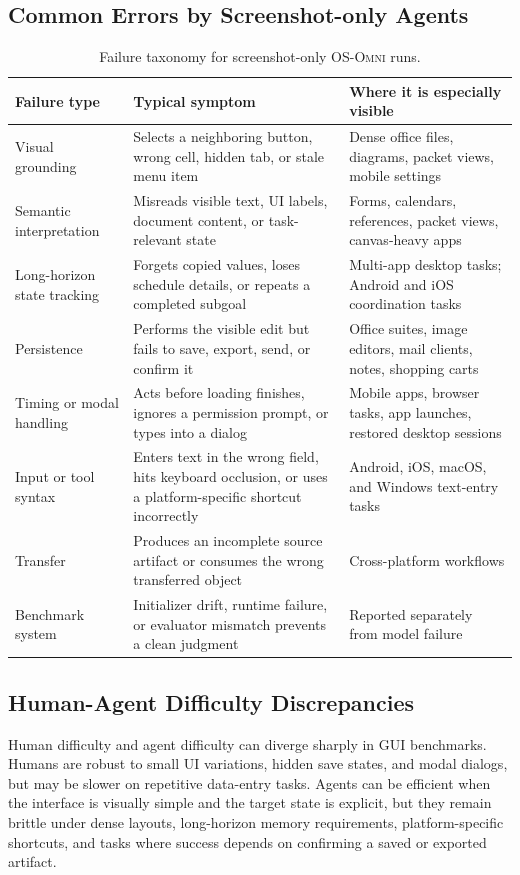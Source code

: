 \subsection{Common Errors by Screenshot-only Agents}
\label{appendix:common_errors}
\begin{table}[ht]
\centering
\caption{Failure taxonomy for screenshot-only \textsc{OS-Omni} runs.}
\label{tab:screenshot_only_failure_taxonomy}
\footnotesize
\setlength{\tabcolsep}{4pt}
\renewcommand{\arraystretch}{1.02}
\begin{tabular}{p{2.8cm}p{5.4cm}p{5.8cm}}
\toprule
Failure type & Typical symptom & Where it is especially visible \\
\midrule
Visual grounding & Selects a neighboring button, wrong cell, hidden tab, or stale menu item & Dense office files, diagrams, packet views, mobile settings \\
Semantic interpretation & Misreads visible text, UI labels, document content, or task-relevant state & Forms, calendars, references, packet views, canvas-heavy apps \\
Long-horizon state tracking & Forgets copied values, loses schedule details, or repeats a completed subgoal & Multi-app desktop tasks; Android and iOS coordination tasks \\
Persistence & Performs the visible edit but fails to save, export, send, or confirm it & Office suites, image editors, mail clients, notes, shopping carts \\
Timing or modal handling & Acts before loading finishes, ignores a permission prompt, or types into a dialog & Mobile apps, browser tasks, app launches, restored desktop sessions \\
Input or tool syntax & Enters text in the wrong field, hits keyboard occlusion, or uses a platform-specific shortcut incorrectly & Android, iOS, macOS, and Windows text-entry tasks \\
Transfer & Produces an incomplete source artifact or consumes the wrong transferred object & Cross-platform workflows \\
Benchmark system & Initializer drift, runtime failure, or evaluator mismatch prevents a clean judgment & Reported separately from model failure \\
\bottomrule
\end{tabular}
\end{table}

\subsection{Human-Agent Difficulty Discrepancies}
\label{appendix:human_vs_agent}
Human difficulty and agent difficulty can diverge sharply in GUI benchmarks. Humans are robust to small UI variations, hidden save states, and modal dialogs, but may be slower on repetitive data-entry tasks. Agents can be efficient when the interface is visually simple and the target state is explicit, but they remain brittle under dense layouts, long-horizon memory requirements, platform-specific shortcuts, and tasks where success depends on confirming a saved or exported artifact.

